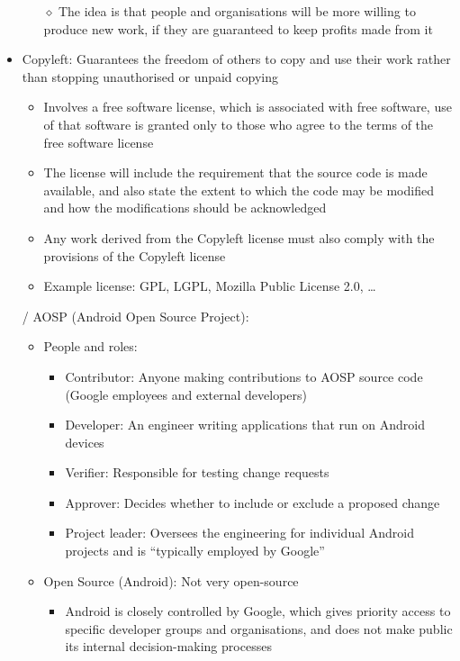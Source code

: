 \documentclass[12pt,openany]{book}
\begin{document}
\begin{itemize}
\begin{itemize}
        \item[$\diamond$] The idea is that people and organisations will be more willing to produce new work, if they are guaranteed to keep profits made from it
    \end{itemize}
    \item Copyleft: Guarantees the freedom of others to copy and use their work rather than stopping unauthorised or unpaid copying
    \begin{itemize}
        \item Involves a free software license, which is associated with free software, use of that software is granted only to those who agree to the terms of the free software license
        \item The license will include the requirement that the source code is made available, and also state the extent to which the code may be modified and how the modifications should be acknowledged
        \item Any work derived from the Copyleft license must also comply with the provisions of the Copyleft license
        \item Example license: GPL, LGPL, Mozilla Public License 2.0, \dots
    \end{itemize}
    \item[/] AOSP (Android Open Source Project):
    \begin{itemize}
        \item People and roles:
        \begin{itemize}
            \item Contributor: Anyone making contributions to AOSP source code (Google employees and external developers)
            \item Developer: An engineer writing applications that run on Android devices
            \item Verifier: Responsible for testing change requests
            \item Approver: Decides whether to include or exclude a proposed change
            \item Project leader: Oversees the engineering for individual Android projects and is ``typically employed by Google''
        \end{itemize}
        \item Open Source (Android): Not very open-source
        \begin{itemize}
            \item Android is closely controlled by Google, which gives priority access to specific developer groups and organisations, and does not make public its internal decision-making processes

\end{itemize}
\end{itemize}
\end{itemize}
\end{document}
